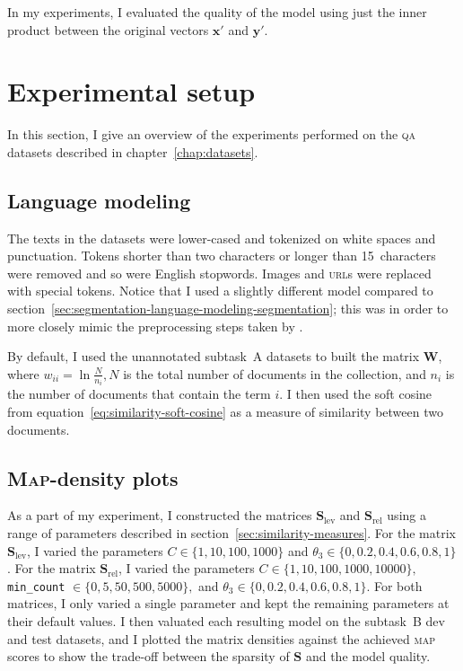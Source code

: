 \documentclass[
  digital, %
  notable, %
  lof,     %
  lot,     %
  nopalatino, color
]{fithesis3}
\def\abbr#1{\textsc{\MakeLowercase{#1}}}
\begin{document}
In my experiments, I evaluated the quality of the model using just the inner
product between the original vectors $\mathbf x'$ and $\mathbf y'$.

\section{Experimental setup}
\label{sec:similarity-experimental-setup}
In this section, I give an overview of the experiments performed on the
\abbr{QA}\index{qa@\abbr{QA}} datasets described in chapter~\ref{chap:datasets}.

\subsection{Language modeling}
The texts in the datasets were lower-cased and tokenized on white spaces and
punctuation. Tokens shorter than two characters or longer than 15~characters
were removed and so were English stopwords. Images and \abbr{URL}s were
replaced with special tokens. Notice that I used a slightly different
model compared to section~\ref{sec:segmentation-language-modeling-segmentation};
this was in order to more closely mimic the preprocessing steps taken by
\textcite{charletdamnati17}.

By default, I used the unannotated subtask~A datasets to built the matrix
$\mathbf W$, where $w_{ii}=\ln\frac N
{n_i},N$ is the total number of
documents in the collection, and $n_i$ is the number of documents that contain
the term $i$.  I then used the soft cosine from
equation~\ref{eq:similarity-soft-cosine} as a measure of similarity between two
documents.

\subsection{\textsc{Map}-density plots}\index{map@\abbr {MAP}}
As a part of my experiment, I constructed the matrices $\mathbf
S_{\textrm{lev}}$ and $\mathbf
S_{\textrm{rel}}$ using a range of
parameters described in section~\ref{sec:similarity-measures}. For the matrix
$\mathbf S_{\textrm{lev}}$, I varied the parameters
$C\in\{1,10,100,1000\}$ and
$\theta_3\in\{0,0.2,0.4,0.6,0.8,1\}$. For the matrix
$\mathbf S_{\textrm{rel}}$, I varied the parameters
$C\in\{1,10,100,1000,10000\},$ \texttt{min\_count}%
${}\in\{0,5,50,500,5000\},$ and
$\theta_3\in\{0,0.2,0.4,0.6,0.8,1\}$.  For both matrices,
I only varied a single parameter and kept the remaining parameters at their
default values. I then valuated each resulting model on the subtask~B dev and
test datasets, and I plotted the matrix densities against the achieved
\abbr{MAP}\index{map@\abbr {MAP}} scores to show the trade-off between the
sparsity of $\mathbf S$ and the model quality.
\end{document}
